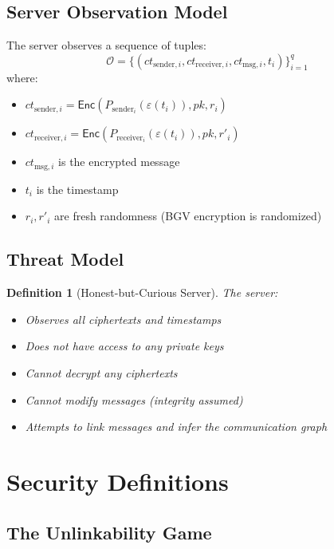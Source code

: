 \documentclass[11pt]{article}
\newtheorem{definition}[theorem]{Definition}
\newcommand{\Enc}{\mathsf{Enc}}
\newcommand{\epoch}{\varepsilon}
\begin{document}
\subsection{Server Observation Model}

The server observes a sequence of tuples:
\[
\mathcal{O} = \{(ct_{\text{sender},i}, ct_{\text{receiver},i}, ct_{\text{msg},i}, t_i)\}_{i=1}^{q}
\]
where:
\begin{itemize}
    \item $ct_{\text{sender},i} = \Enc(P_{\text{sender}_i}(\epoch(t_i)), pk, r_i)$
    \item $ct_{\text{receiver},i} = \Enc(P_{\text{receiver}_i}(\epoch(t_i)), pk, r'_i)$
    \item $ct_{\text{msg},i}$ is the encrypted message
    \item $t_i$ is the timestamp
    \item $r_i, r'_i$ are fresh randomness (BGV encryption is randomized)
\end{itemize}

\subsection{Threat Model}

\begin{definition}[Honest-but-Curious Server]
The server:
\begin{itemize}
    \item Observes all ciphertexts and timestamps
    \item Does not have access to any private keys
    \item Cannot decrypt any ciphertexts
    \item Cannot modify messages (integrity assumed)
    \item Attempts to link messages and infer the communication graph
\end{itemize}
\end{definition}

\section{Security Definitions}

\subsection{The Unlinkability Game}
\end{document}

